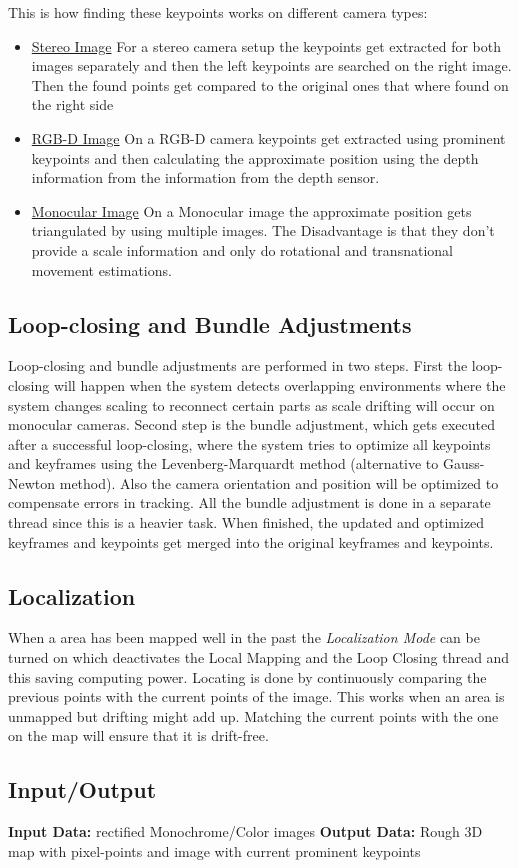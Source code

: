 This is how finding these keypoints works on different camera types:
\begin{itemize}
    \item \underline{Stereo Image} \newline
    For a stereo camera setup the keypoints get extracted for both images separately and then the left keypoints are searched on the right image. Then the found points get compared to the original ones that where found on the right side
    \item \underline{RGB-D Image} \newline
    On a RGB-D camera keypoints get extracted using prominent keypoints and then calculating the approximate position using the depth information from the information from the depth sensor.
    \item \underline{Monocular Image} \newline
    On a Monocular image the approximate position gets triangulated by using multiple images. The Disadvantage is that they don't provide a scale information and only do rotational and transnational movement estimations.
\end{itemize}

\subsection{Loop-closing and Bundle Adjustments}
Loop-closing and bundle adjustments are performed in two steps. First the loop-closing will happen when the system detects overlapping environments where the system changes scaling to reconnect certain parts as scale drifting will occur on monocular cameras.\newline
Second step is the bundle adjustment, which gets executed after a successful loop-closing, where the system tries to optimize all keypoints and keyframes using the Levenberg-Marquardt method (alternative to Gauss-Newton method).\cite{LevenbergMarquardMethod} Also the camera orientation and position will be optimized to compensate errors in tracking. All the bundle adjustment is done in a separate thread since this is a heavier task.\newline
When finished, the updated and optimized keyframes and keypoints get merged into the original keyframes and keypoints.\cite{orbslam2}

\subsection {Localization}
When a area has been mapped well in the past the \textit{Localization Mode} can be turned on which deactivates the Local Mapping and the Loop Closing thread and this saving computing power.
Locating is done by continuously comparing the previous points with the current points of the image. This works when an area is unmapped but drifting might add up.
Matching the current points with the one on the map will ensure that it is drift-free.\cite{orbslam2}

\subsection{Input/Output}
\textbf{Input Data:} rectified Monochrome/Color images\newline
\textbf{Output Data:} Rough 3D map with pixel-points and image with current prominent keypoints